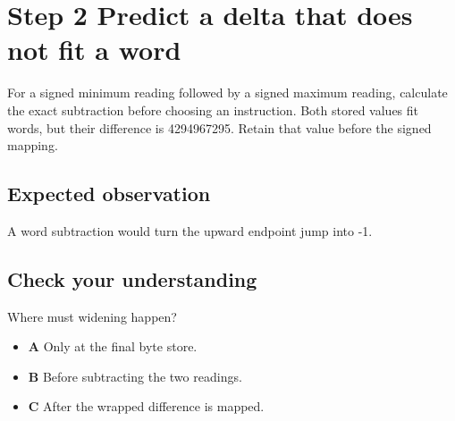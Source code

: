 \section{Step 2 Predict a delta that does not fit a word}\label{delta-s02}

For a signed minimum reading followed by a signed maximum reading, calculate the exact subtraction before choosing an instruction. Both stored values fit words, but their difference is 4294967295. Retain that value before the signed mapping.

\subsection{Expected observation}
A word subtraction would turn the upward endpoint jump into -1.

\subsection{Check your understanding}
Where must widening happen?

\begin{itemize}
\item \textbf{A} Only at the final byte store.
\item \textbf{B} Before subtracting the two readings.
\item \textbf{C} After the wrapped difference is mapped.
\end{itemize}
